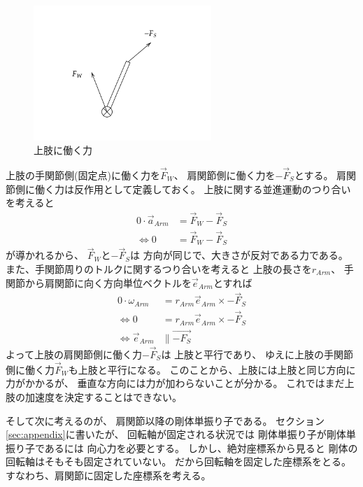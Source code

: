 \documentclass[a4paper,11pt]{jsarticle}
\begin{document}
\begin{figure}[h]
  \centering
  \includegraphics[width = 0.6\textwidth]{F_arm_config.png}
  \caption{上肢に働く力}
  \label{F_arm_config.png}
\end{figure}

上肢の手関節側(固定点)に働く力を$\vec{F}_W$、
肩関節側に働く力を$-\vec{F}_S$とする。
肩関節側に働く力は反作用として定義しておく。
上肢に関する並進運動のつり合いを考えると
\begin{align}
  0 \cdot \vec{a}_{Arm} &= \vec{F}_W - \vec{F}_S
  \\
  \Leftrightarrow
  0 &= \vec{F}_W - \vec{F}_S
\end{align}
が導かれるから、
$\vec{F}_W$と$-\vec{F}_S$は
方向が同じで、大きさが反対である力である。
また、手関節周りのトルクに関するつり合いを考えると
上肢の長さを$r_{Arm}$、
手関節から肩関節に向く方向単位ベクトルを$\vec{e}_{Arm}$とすれば
\begin{align}
  0 \cdot \omega_{Arm} &= r_{Arm} \vec{e}_{Arm} \times -\vec{F}_S
  \\
  \Leftrightarrow
  0 &= r_{Arm} \vec{e}_{Arm} \times -\vec{F}_S
  \\
  \Leftrightarrow
  \vec{e}_{Arm} &\parallel \vec{-F_S}
\end{align}
よって上肢の肩関節側に働く力$-\vec{F}_S$は
上肢と平行であり、
ゆえに上肢の手関節側に働く力$\vec{F}_W$も上肢と平行になる。
このことから、上肢には上肢と同じ方向に力がかかるが、
垂直な方向には力が加わらないことが分かる。
これではまだ上肢の加速度を決定することはできない。

そして次に考えるのが、
肩関節以降の剛体単振り子である。
セクション\ref{sec:appendix}に書いたが、
回転軸が固定される状況では
剛体単振り子が剛体単振り子であるには
向心力を必要とする。
しかし、絶対座標系から見ると
剛体の回転軸はそもそも固定されていない。
だから回転軸を固定した座標系をとる。
すなわち、肩関節に固定した座標系を考える。
\end{document}

